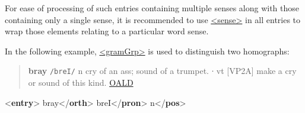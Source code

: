 For ease of processing of such entries containing multiple senses along with those containing only a single sense, it is recommended to use \hyperref[TEI.sense]{<sense>} in all entries to wrap those elements relating to a particular word sense.\par
In the following example, \hyperref[TEI.gramGrp]{<gramGrp>} is used to distinguish two homographs:
\begin{quote}{\bfseries bray} \texttt{/breI/} n cry of an ass; sound of a trumpet. ∙ vt [VP2A] make a cry or sound of this kind. \hyperref[DIC-OALD]{OALD}\end{quote}
 \par\bgroup{}\exampleFont \begin{shaded}\noindent\mbox{}{<\textbf{entry}>}\mbox{}\newline 
{}\mbox{}\newline 
\hspace*{1em}bray{</\textbf{orth}>}\mbox{}\newline 
\hspace*{1em}breI{</\textbf{pron}>}\mbox{}\newline 
{}\mbox{}\newline 
{}\mbox{}\newline 
\hspace*{1em}\mbox{}\newline 
\hspace*{1em}\hspace*{1em}n{</\textbf{pos}>}\mbox{}\newline 
\hspace*{1em}\mbox{}\newline 

\end{shaded}
